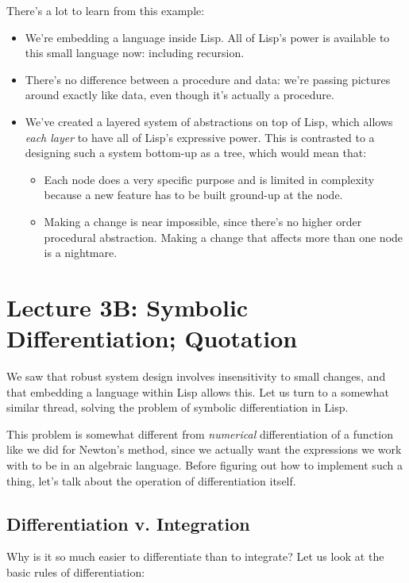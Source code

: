 \documentclass[9pt]{report}
\begin{document}
There's a lot to learn from this example:
\begin{itemize}
\item We're embedding a language inside Lisp. All of Lisp's power is
available to this small language now: including recursion.
\item There's no difference between a procedure and data: we're
passing pictures around exactly like data, even though it's
actually a procedure.
\item We've created a layered system of abstractions on top of Lisp,
which allows \emph{each layer} to have all of Lisp's expressive
power. This is contrasted to a designing such a system bottom-up
as a tree, which would mean that:
\begin{itemize}
\item Each node does a very specific purpose and is limited in
complexity because a new feature has to be built ground-up at
the node.
\item Making a change is near impossible, since there's no higher
order procedural abstraction. Making a change that affects
more than one node is a nightmare.
\end{itemize}
\end{itemize}

\chapter{Lecture 3B: Symbolic Differentiation; Quotation}
\label{sec:org134e13b}

We saw that robust system design involves insensitivity to small
changes, and that embedding a language within Lisp allows this. Let
us turn to a somewhat similar thread, solving the problem of
symbolic differentiation in Lisp.

This problem is somewhat different from \emph{numerical} differentiation
of a function like we did for Newton's method, since we actually
want the expressions we work with to be in an algebraic language.
Before figuring out how to implement such a thing, let's talk about
the operation of differentiation itself.

\section{Differentiation v. Integration}
\label{sec:org423c948}

Why is it so much easier to differentiate than to integrate?
Let us look at the basic rules of differentiation:
\end{document}
